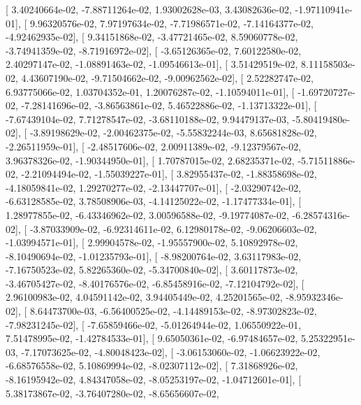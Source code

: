 \documentclass{article}
\begin{document}
       [  3.40240664e-02,  -7.88711264e-02,   1.93002628e-03,
          3.43082636e-02,  -1.97110941e-01],
       [  9.96320576e-02,   7.97197634e-02,  -7.71986571e-02,
         -7.14164377e-02,  -4.92462935e-02],
       [  9.34151868e-02,  -3.47721465e-02,   8.59060778e-02,
         -3.74941359e-02,  -8.71916972e-02],
       [ -3.65126365e-02,   7.60122580e-02,   2.40297147e-02,
         -1.08891463e-02,  -1.09546613e-01],
       [  3.51429519e-02,   8.11158503e-02,   4.43607190e-02,
         -9.71504662e-02,  -9.00962562e-02],
       [  2.52282747e-02,   6.93775066e-02,   1.03704352e-01,
          1.20076287e-02,  -1.10594011e-01],
       [ -1.69720727e-02,  -7.28141696e-02,  -3.86563861e-02,
          5.46522886e-02,  -1.13713322e-01],
       [ -7.67439104e-02,   7.71278547e-02,  -3.68110188e-02,
          9.94479137e-03,  -5.80419480e-02],
       [ -3.89198629e-02,  -2.00462375e-02,  -5.55832244e-03,
          8.65681828e-02,  -2.26511959e-01],
       [ -2.48517606e-02,   2.00911389e-02,  -9.12379567e-02,
          3.96378326e-02,  -1.90344950e-01],
       [  1.70787015e-02,   2.68235371e-02,  -5.71511886e-02,
         -2.21094494e-02,  -1.55039227e-01],
       [  3.82955437e-02,  -1.88358698e-02,  -4.18059841e-02,
          1.29270277e-02,  -2.13447707e-01],
       [ -2.03290742e-02,  -6.63128585e-02,   3.78508906e-03,
         -4.14125022e-02,  -1.17477334e-01],
       [  1.28977855e-02,  -6.43346962e-02,   3.00596588e-02,
         -9.19774087e-02,  -6.28574316e-02],
       [ -3.87033909e-02,  -6.92314611e-02,   6.12980178e-02,
         -9.06206603e-02,  -1.03994571e-01],
       [  2.99904578e-02,  -1.95557900e-02,   5.10892978e-02,
         -8.10490694e-02,  -1.01235793e-01],
       [ -8.98200764e-02,   3.63117983e-02,  -7.16750523e-02,
          5.82265360e-02,  -5.34700840e-02],
       [  3.60117873e-02,  -3.46705427e-02,  -8.40176576e-02,
         -6.85458916e-02,  -7.12104792e-02],
       [  2.96100983e-02,   4.04591142e-02,   3.94405449e-02,
          4.25201565e-02,  -8.95932346e-02],
       [  8.64473700e-03,  -6.56400525e-02,  -4.14489153e-02,
         -8.97302823e-02,  -7.98231245e-02],
       [ -7.65859466e-02,  -5.01264944e-02,   1.06550922e-01,
          7.51478995e-02,  -1.42784533e-01],
       [  9.65050361e-02,  -6.97484657e-02,   5.25322951e-03,
         -7.17073625e-02,  -4.80048423e-02],
       [ -3.06153060e-02,  -1.06623922e-02,  -6.68576558e-02,
          5.10869994e-02,  -8.02307112e-02],
       [  7.31868926e-02,  -8.16195942e-02,   4.84347058e-02,
         -8.05253197e-02,  -1.04712601e-01],
       [  5.38173867e-02,  -3.76407280e-02,  -8.65656607e-02,
\end{document}
